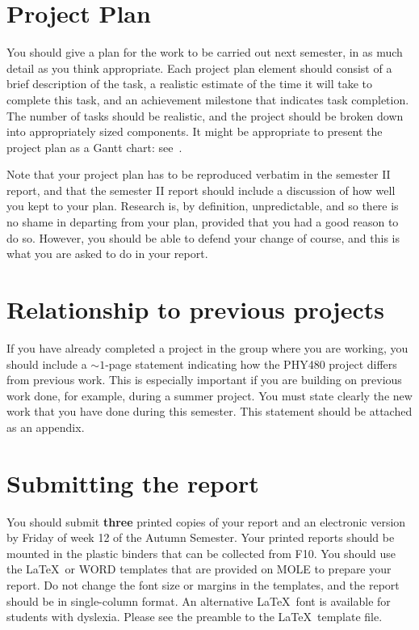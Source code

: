 \documentclass[a4paper,11pt]{article}
\begin{document}
\section{Project Plan}
You should give a plan for the work to be carried out next semester, in as much detail as you think appropriate. Each project plan element should consist of a brief description of the task, a realistic estimate of the time it will take to complete this task, and an achievement milestone that indicates task completion. The number of tasks should be realistic, and the project should be broken down into appropriately sized components. It might be appropriate to present the project plan as a Gantt chart: see~\cite{gannt}.

Note that your project plan has to be reproduced verbatim in the semester II report, and that the semester II report should include a discussion of how well you kept to your plan. Research is, by definition, unpredictable, and so there is no shame in departing from your plan, provided that you had a good reason to do so. However, you should be able to defend your change of course, and this is what you are asked to do in your report.  

\section{Relationship to previous projects}
If you have already completed a project in the group where you are working, you should include a $\sim 1$-page statement indicating how the PHY480 project differs from previous work. This is especially important if you are building on previous work done, for example, during a summer project. You must state clearly the new work that you have done during this semester. This statement should be attached as an appendix.

\section{Submitting the report}

You should submit \textbf{three} printed copies of your report and an electronic version by Friday of week 12 of the Autumn Semester. Your printed reports should be mounted in the plastic binders that can be collected from F10. You should use the \LaTeX\ or WORD templates that are provided on MOLE to prepare your report. Do not change the font size or margins in the templates, and the report should be in single-column format. An alternative \LaTeX\  font is available for students with dyslexia. Please see the preamble to the \LaTeX\  template file.
\end{document}
